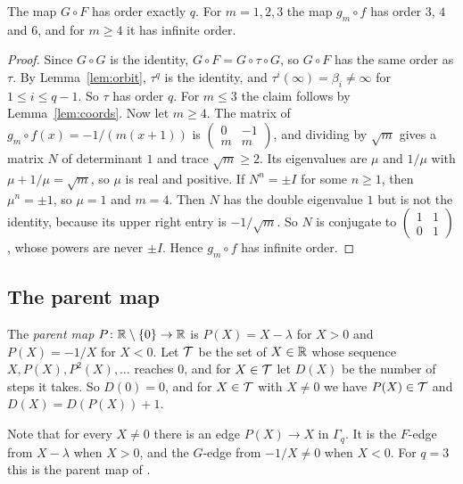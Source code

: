 \begin{lemma}\label{lem:order}
The map $G\circ F$ has order exactly $q$. For $m=1,2,3$ the map $g_m\circ f$ has order $3$, $4$ and
$6$, and for $m\ge4$ it has infinite order.
\end{lemma}

\begin{proof}
Since $G\circ G$ is the identity, $G\circ F=G\circ\tau\circ G$, so $G\circ F$ has the same order as
$\tau$. By Lemma~\ref{lem:orbit}, $\tau^q$ is the identity, and $\tau^i(\infty)=\beta_i\neq\infty$ for
$1\le i\le q-1$. So $\tau$ has order $q$. For $m\le3$ the claim follows by Lemma~\ref{lem:coords}.
Now let $m\ge4$. The matrix of $g_m\circ f(x)=-1/(m(x+1))$ is
$\left(\begin{smallmatrix}0&-1\\m&m\end{smallmatrix}\right)$, and dividing by $\sqrt m$ gives a matrix
$N$ of determinant $1$ and trace $\sqrt m\ge2$. Its eigenvalues are $\mu$ and $1/\mu$ with
$\mu+1/\mu=\sqrt m$, so $\mu$ is real and positive. If $N^n=\pm I$ for some $n\ge1$, then $\mu^n=\pm1$,
so $\mu=1$ and $m=4$. Then $N$ has the double eigenvalue $1$ but is not the identity, because its
upper right entry is $-1/\sqrt m$. So $N$ is conjugate to
$\left(\begin{smallmatrix}1&1\\0&1\end{smallmatrix}\right)$, whose powers are never $\pm I$. Hence
$g_m\circ f$ has infinite order.
\end{proof}

\subsection{The parent map}

\begin{definition}\label{def:parent}
The \emph{parent map} $P\colon\mathbb{R}\setminus\{0\}\to\mathbb{R}$ is $P(X)=X-\lambda$ for $X>0$ and $P(X)=-1/X$ for
$X<0$. Let $\mathcal{T}$ be the set of $X\in\mathbb{R}$ whose sequence $X,P(X),P^2(X),\dots$ reaches $0$, and for
$X\in\mathcal{T}$ let $D(X)$ be the number of steps it takes. So $D(0)=0$, and for $X\in\mathcal{T}$ with
$X\neq0$ we have $P(X)\in\mathcal{T}$ and $D(X)=D(P(X))+1$.
\end{definition}

Note that for every $X\neq0$ there is an edge $P(X)\to X$ in $\Gamma_q$. It is the $F$-edge from
$X-\lambda$ when $X>0$, and the $G$-edge from $-1/X\neq0$ when $X<0$. For $q=3$ this is the parent
map of \cite[Definition~3.1]{P137}.

